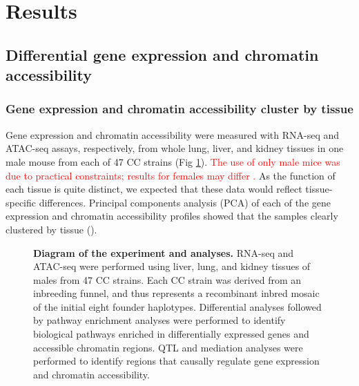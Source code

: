 \documentclass[10pt,letterpaper]{article}
\newcommand{\WVinline}[1]{\textcolor{red}{#1}}
\begin{document}
\section*{Results}
\subsection*{Differential gene expression and chromatin accessibility}

\subsubsection*{Gene expression and chromatin accessibility cluster by tissue}
Gene expression and chromatin accessibility were measured with RNA-seq and ATAC-seq assays, respectively, from whole lung, liver, and kidney tissues in one male mouse from each of 47 CC strains (Fig \ref{fig:overview}). 
\WVinline{The use of only male mice was due to practical constraints; results for females may differ \cite{Chick2016}.} As the function of each tissue is quite distinct, we expected that these data would reflect tissue-specific differences. Principal components analysis (PCA) of each of the gene expression and chromatin accessibility profiles showed that the samples clearly clustered by tissue (). 

\begin{figure}[!h]
\caption{{\bf Diagram of the experiment and analyses.}
RNA-seq and ATAC-seq were performed using liver, lung, and kidney tissues of males from 47 CC strains. Each CC strain was derived from an inbreeding funnel, and thus represents a recombinant inbred mosaic of the initial eight founder haplotypes. Differential analyses followed by pathway enrichment analyses were performed to identify biological pathways enriched in differentially expressed genes and accessible chromatin regions. QTL and mediation analyses were performed to identify regions that causally regulate gene expression and chromatin accessibility.}
\label{fig:overview}
\end{figure}
\end{document}
